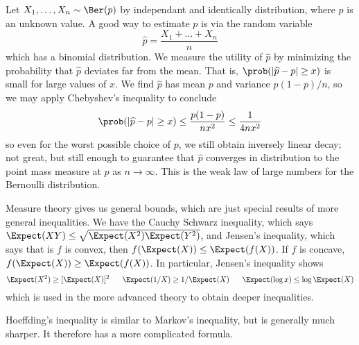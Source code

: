 \begin{example}
    Let $X_1, \dots, X_n \sim \Ber(p)$ by independant and identically distribution, where $p$ is an unknown value. A good way to estimate $p$ is via the random variable
    \[ \widehat{p} = \frac{X_1 + \dots + X_n}{n} \]
    which has a binomial distribution. We measure the utility of $\widehat{p}$ by minimizing the probability that $\widehat{p}$ deviates far from the mean. That is, $\prob(|\widehat{p} - p| \geq x)$ is small for large values of $x$. We find $\widehat{p}$ has mean $p$ and variance $p(1-p)/n$, so we may apply Chebyshev's inequality to conclude
    \[ \prob(|\widehat{p} - p| \geq x) \leq \frac{p(1-p)}{nx^2} \leq \frac{1}{4nx^2} \]
    so even for the worst possible choice of $p$, we still obtain inversely linear decay; not great, but still enough to guarantee that $\widehat{p}$ converges in distribution to the point mass measure at $p$ as $n \to \infty$. This is the weak law of large numbers for the Bernoulli distribution.
\end{example}

Measure theory gives us general bounds, which are just special results of more general inequalities. We have the Cauchy Schwarz inequality, which says $\Expect(XY) \leq \sqrt{\Expect(X^2) \Expect(Y^2)}$, and Jensen's inequality, which says that is $f$ is convex, then $f(\Expect(X)) \leq \Expect(f(X))$. If $f$ is concave, $f(\Expect(X)) \geq \Expect(f(X))$. In particular, Jensen's inequality shows
%
\[ \Expect(X^2) \geq [\Expect(X)]^2\ \ \ \ \ \Expect(1/X) \geq 1/\Expect(X)\ \ \ \ \ \Expect(\log x) \leq \log \Expect(X) \]
%
which is used in the more advanced theory to obtain deeper inequalities.

Hoeffding's inequality is similar to Markov's inequality, but is generally much sharper. It therefore has a more complicated formula.

